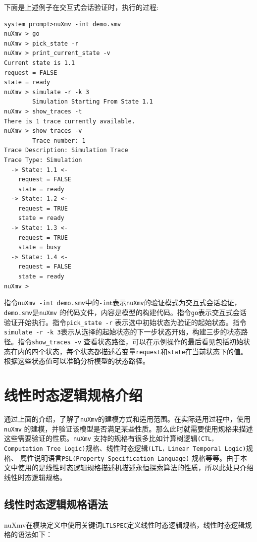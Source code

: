 下面是上述例子在交互式会话验证时，执行的过程:

\begin{lstlisting}
system prompt>nuXmv -int demo.smv
nuXmv > go
nuXmv > pick_state -r
nuXmv > print_current_state -v
Current state is 1.1
request = FALSE
state = ready
nuXmv > simulate -r -k 3
        Simulation Starting From State 1.1 
nuXmv > show_traces -t
There is 1 trace currently available.
nuXmv > show_traces -v
        Trace number: 1   
Trace Description: Simulation Trace
Trace Type: Simulation
  -> State: 1.1 <-
    request = FALSE
    state = ready
  -> State: 1.2 <-
    request = TRUE
    state = ready
  -> State: 1.3 <-
    request = TRUE
    state = busy
  -> State: 1.4 <-
    request = FALSE
    state = ready
nuXmv >
\end{lstlisting}

指令\verb|nuXmv -int demo.smv|中的\verb|-in|t表示\verb|nuXmv|的验证模式为交互式会话验证，\verb|demo.smv|是\verb|nuXmv| 的代码文件，内容是模型的构建代码。指令\verb|go|表示交互式会话验证开始执行。指令\verb|pick_state -r| 表示选中初始状态为验证的起始状态。指令\verb|simulate -r -k 3|表示从选择的起始状态的下一步状态开始，构建三步的状态路径。指令\verb|show_traces -v| 查看状态路径，可以在示例操作的最后看见包括初始状态在内的四个状态，每个状态都描述着变量\verb|request|和\verb|state|在当前状态下的值。根据这些状态值可以准确分析模型的状态路径。

\section{线性时态逻辑规格介绍}
通过上面的介绍，了解了\verb|nuXmv|的建模方式和适用范围。在实际适用过程中，使用\verb|nuXmv| 的建模，并验证该模型是否满足某些性质。那么此时就需要使用规格来描述这些需要验证的性质。\verb|nuXmv| 支持的规格有很多比如计算树逻辑\verb|(CTL，Computation Tree Logic)|规格、线性时态逻辑\verb|(LTL，Linear Temporal Logic)|规格、 属性说明语言\verb|PSL(Property Specification Language)| 规格等等。由于本文中使用的是线性时态逻辑规格描述机描述永恒探索算法的性质，所以此处只介绍线性时态逻辑规格。

\subsection{线性时态逻辑规格语法}

nuXmv在模块定义中使用关键词\verb|LTLSPEC|定义线性时态逻辑规格，线性时态逻辑规格的语法如下：

